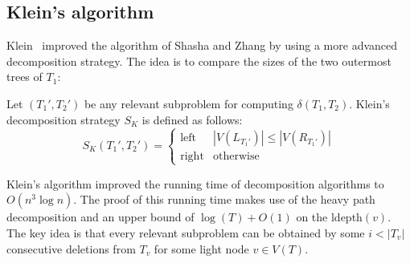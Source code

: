 \subsection{Klein's algorithm}
Klein~\cite{Kle} improved the algorithm of Shasha and Zhang by using a more advanced decomposition strategy. The idea is to compare the sizes of the two outermost trees of $T_1$:
\begin{defin}
Let $(T_1',T_2')$ be any relevant subproblem for computing $\delta(T_1,T_2)$. Klein's decomposition strategy $S_K$ is defined as follows:\\
$$ S_K(T_1',T_2') = 
\begin{cases}
\text{left} & |V(L_{T_1'})| \leq |V(R_{T_1'})| \\
\text{right} & \text{otherwise} 
\end{cases}$$
\end{defin}
Klein's algorithm improved the running time of decomposition algorithms to $O(n^3\log n)$. The proof of this running time makes use of the heavy path decomposition and an upper bound of $\log(T) + O(1)$ on the ldepth$(v)$. The key idea is that every relevant subproblem can be obtained by some $i<|T_v|$ consecutive deletions from $T_v$ for some light node $v \in V(T)$.

